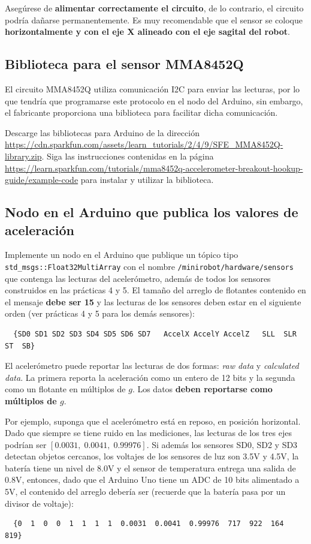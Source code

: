 \documentclass[letterpaper,12pt]{article}
\begin{document}
Asegúrese de \textbf{alimentar correctamente el circuito}, de lo contrario, el circuito podría dañarse permanentemente. Es muy recomendable que el sensor se coloque \textbf{horizontalmente y con el eje X alineado con el eje sagital del robot}. 

\subsection{Biblioteca para el sensor MMA8452Q}

El circuito MMA8452Q utiliza comunicación I2C para enviar las lecturas, por lo que tendría que programarse este protocolo en el nodo del Arduino, sin embargo, el fabricante proporciona una biblioteca para facilitar dicha comunicación. 

Descarge las bibliotecas para Arduino de la dirección \url{https://cdn.sparkfun.com/assets/learn_tutorials/2/4/9/SFE_MMA8452Q-library.zip}. Siga las instrucciones contenidas en la página \url{https://learn.sparkfun.com/tutorials/mma8452q-accelerometer-breakout-hookup-guide/example-code} para instalar y utilizar la biblioteca. 

\subsection{Nodo en el Arduino que publica los valores de aceleración}
Implemente un nodo en el Arduino que publique un tópico tipo \texttt{std\_msgs::Float32MultiArray} con el nombre \texttt{/minirobot/hardware/sensors} que contenga las lecturas del acelerómetro, además de todos los sensores construidos en las prácticas 4 y 5. El tamaño del arreglo de flotantes contenido en el mensaje \textbf{debe ser 15} y las lecturas de los sensores deben estar en el siguiente orden (ver prácticas 4 y 5 para los demás sensores): 

\begin{verbatim}
  {SD0 SD1 SD2 SD3 SD4 SD5 SD6 SD7   AccelX AccelY AccelZ   SLL  SLR  ST  SB}
\end{verbatim}

El acelerómetro puede reportar las lecturas de dos formas: \textit{raw data} y \textit{calculated data}. La primera reporta la aceleración como un entero de 12 bits y la segunda como un flotante en múltiplos de $g$. Los datos \textbf{deben reportarse como múltiplos de $g$}.

Por ejemplo, suponga que el acelerómetro está en reposo, en posición horizontal. Dado que siempre se tiene ruido en las mediciones, las lecturas de los tres ejes podrían ser $[0.0031,\;0.0041,\;0.99976]$. Si además los sensores SD0, SD2 y SD3 detectan objetos cercanos, los voltajes de los sensores de luz son 3.5V y 4.5V, la batería tiene un nivel de 8.0V y el sensor de temperatura entrega una salida de 0.8V, entonces, dado que el Arduino Uno tiene un ADC de 10 bits alimentado a 5V, el contenido del arreglo debería ser (recuerde que la batería pasa por un divisor de voltaje):
\begin{verbatim}
  {0  1  0  0  1  1  1  1  0.0031  0.0041  0.99976  717  922  164  819}
\end{verbatim}
\end{document}
